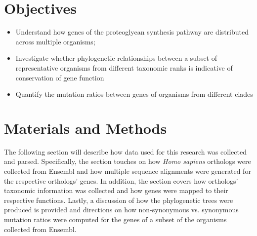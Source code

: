 \documentclass{article}
\begin{document}
\section{Objectives}
\begin{itemize}
	\item Understand how genes of the proteoglycan synthesis pathway are distributed across multiple organisms;
	\item Investigate whether phylogenetic relationships between a subset of representative organisms from different taxonomic ranks is indicative of conservation of gene function
	\item Quantify the mutation ratios between genes of organisms from different clades
\end{itemize}

\section{Materials and Methods}

The following section will describe how data used for this research was collected and parsed. Specifically, the section touches on how \textit{Homo sapiens} orthologs were collected from Ensembl and how multiple sequence alignments were generated for the respective orthologs' genes. In addition, the section covers how orthologs' taxonomic information was collected and how genes were mapped to their respective functions. Lastly, a discussion of how the phylogenetic trees were produced is provided and directions on how non-synonymous vs. synonymous mutation ratios were computed for the genes of a subset of the organisms collected from Ensembl.
\end{document}
